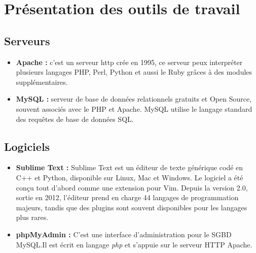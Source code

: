 \documentclass{report}
\begin{document}
\newpage
\section{Présentation des outils de travail}
\subsection{Serveurs}
\begin{itemize}
    \item \textbf{Apache :} c’est un serveur http crée en 1995, ce serveur peux interpréter plusieurs  langages PHP, Perl, Python et aussi le Ruby grâces à des modules supplémentaires.\\
    \item \textbf{MySQL :} serveur de base de données relationnels gratuits et Open Source, souvent associés avec le PHP et Apache. MySQL utilise le langage standard des requêtes de base de données SQL.
\end{itemize}
\subsection{Logiciels}
\begin{itemize}
    \item \textbf{Sublime Text :} Sublime Text est un éditeur de texte générique codé en C++ et Python, disponible sur Linux, Mac et Windows. Le logiciel a été conçu tout d'abord comme une extension pour Vim.
    Depuis la version 2.0, sortie en 2012, l'éditeur prend en charge 44 langages de programmation majeurs, tandis que des plugins sont souvent disponibles pour les langages plus rares.\cite{sublime}
    \item \textbf{phpMyAdmin :} C'est une interface d'administration pour le SGBD MySQL.Il est écrit en langage \emph{php} et s'appuie sur le serveur HTTP Apache.\cite{phpmyadmin}
\end{itemize}
\end{document}

